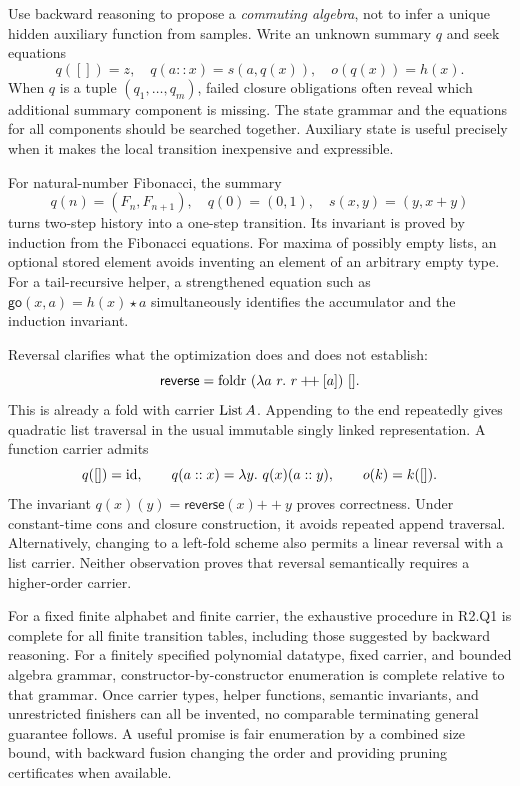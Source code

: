 
\answer Use backward reasoning to propose a \emph{commuting algebra}, not to infer a unique hidden auxiliary function from samples. Write an unknown summary $q$ and seek equations
\[
 q([])=z,\quad q(a::x)=s(a,q(x)),\quad o(q(x))=h(x).
\]
When $q$ is a tuple $(q_1,\ldots,q_m)$, failed closure obligations often reveal which additional summary component is missing. The state grammar and the equations for all components should be searched together. Auxiliary state is useful precisely when it makes the local transition inexpensive and expressible.

For natural-number Fibonacci, the summary
\[
 q(n)=(F_n,F_{n+1}),\quad q(0)=(0,1),\quad s(x,y)=(y,x+y)
\]
turns two-step history into a one-step transition. Its invariant is proved by induction from the Fibonacci equations. For maxima of possibly empty lists, an optional stored element avoids inventing an element of an arbitrary empty type. For a tail-recursive helper, a strengthened equation such as $\mathsf{go}(x,a)=h(x)\star a$ simultaneously identifies the accumulator and the induction invariant.

Reversal clarifies what the optimization does and does not establish:
\[
 \mathsf{reverse}=\fold\ (\lambda a\ r.\ r\mathbin{+\!+}[a])\ [].
\]
This is already a fold with carrier $\operatorname{List} A$. Appending to the end repeatedly gives quadratic list traversal in the usual immutable singly linked representation. A function carrier admits
\[
 q([])=\id,\qquad q(a::x)=\lambda y.\ q(x)(a::y),\qquad
 o(k)=k([]).
\]
The invariant $q(x)(y)=\mathsf{reverse}(x)\mathbin{+\!+}y$ proves correctness. Under constant-time cons and closure construction, it avoids repeated append traversal. Alternatively, changing to a left-fold scheme also permits a linear reversal with a list carrier. Neither observation proves that reversal semantically requires a higher-order carrier.

For a fixed finite alphabet and finite carrier, the exhaustive procedure in R2.Q1 is complete for all finite transition tables, including those suggested by backward reasoning. For a finitely specified polynomial datatype, fixed carrier, and bounded algebra grammar, constructor-by-constructor enumeration is complete relative to that grammar. Once carrier types, helper functions, semantic invariants, and unrestricted finishers can all be invented, no comparable terminating general guarantee follows. A useful promise is fair enumeration by a combined size bound, with backward fusion changing the order and providing pruning certificates when available.

